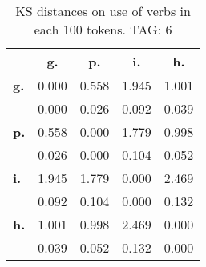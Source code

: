 \begin{table}[h!]
\begin{center}
\begin{tabular}{| l || c | c | c | c |}\hline
 & {\bf g.} & {\bf p.} & {\bf i.} & {\bf h.} \\\hline\hline
{\bf g.} & 0.000 & 0.558 & 1.945 & 1.001 \\
{\bf } & 0.000 & 0.026 & 0.092 & 0.039 \\\hline
{\bf p.} & 0.558 & 0.000 & 1.779 & 0.998 \\
{\bf } & 0.026 & 0.000 & 0.104 & 0.052 \\\hline
{\bf i.} & 1.945 & 1.779 & 0.000 & 2.469 \\
{\bf } & 0.092 & 0.104 & 0.000 & 0.132 \\\hline
{\bf h.} & 1.001 & 0.998 & 2.469 & 0.000 \\
{\bf } & 0.039 & 0.052 & 0.132 & 0.000 \\\hline
\end{tabular}
\caption{KS distances on use of verbs in each 100 tokens. TAG: 6}
\end{center}
\end{table}